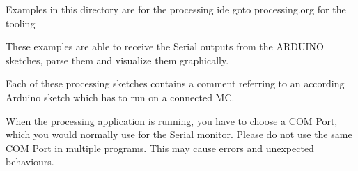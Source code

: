 Examples in this directory are for the processing ide goto processing.\+org for the tooling

These examples are able to receive the Serial outputs from the ARDUINO sketches, parse them and visualize them graphically.

Each of these processing sketches contains a comment referring to an according Arduino sketch which has to run on a connected MC.

When the processing application is running, you have to choose a COM Port, which you would normally use for the Serial monitor. Please do not use the same COM Port in multiple programs. This may cause errors and unexpected behaviours. 